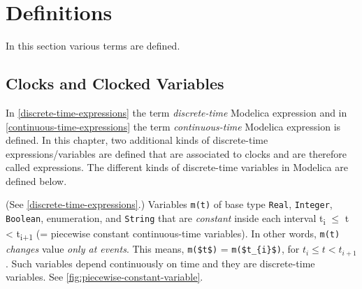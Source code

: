 \section{Definitions}\label{definitions}

In this section various terms are defined.

\subsection{Clocks and Clocked Variables}\label{clocks-and-clocked-variables}


In \cref{discrete-time-expressions} the term \emph{discrete-time} Modelica expression and in \cref{continuous-time-expressions} the term \emph{continuous-time} Modelica expression is defined.
In this chapter, two additional kinds of discrete-time expressions/variables are defined that are associated to clocks and are therefore called  expressions.  The
different kinds of discrete-time variables in Modelica are defined below.

\begin{definition}
(See \cref{discrete-time-expressions}.)  Variables \lstinline!m(t)! of base type \lstinline!Real!, \lstinline!Integer!, \lstinline!Boolean!, enumeration, and \lstinline!String! that are
\emph{constant} inside each interval t\textsubscript{i} $\le$ t \textless{} t\textsubscript{i+1} (= piecewise constant continuous-time variables).  In other words, \lstinline!m(t)! \emph{changes}
value \emph{only at events}.  This means, \lstinline!m($t$)! = \lstinline!m($t_{i}$)!, for $t_{i} \leq t < t_{i+1}$.  Such variables depend continuously on time and they are discrete-time variables.
See \cref{fig:piecewise-constant-variable}.
\end{definition}


